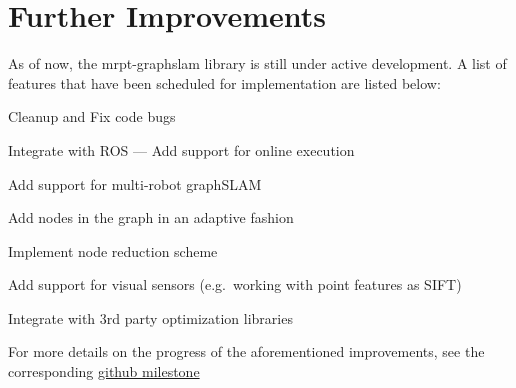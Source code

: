 \section{Further Improvements}
As of now, the mrpt-graphslam library is still under active development. A list of
features that have been scheduled for implementation are listed below:

\begin{itemize*}
    \item Cleanup and Fix code bugs
    \item Integrate with ROS --- Add support for online execution
    \item Add support for multi-robot graphSLAM
    \item Add nodes in the graph in an adaptive fashion
    \item Implement node reduction scheme
    \item Add support for visual sensors (e.g.\ working with point features as SIFT)
    \item Integrate with 3rd party optimization libraries
\end{itemize*}

For more details on the progress of the aforementioned improvements, see the
corresponding \href{https://github.com/MRPT/mrpt/milestone/9}{github milestone}


